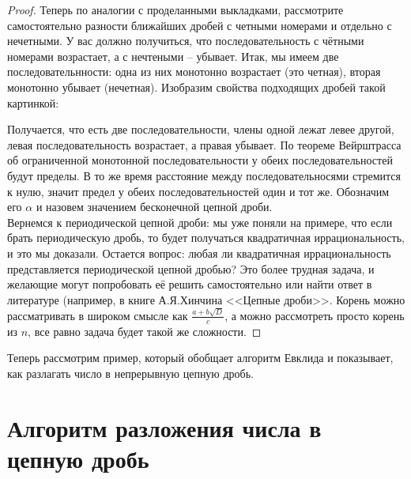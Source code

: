 \documentclass[russian]{lecture-notes}
\begin{document}
\begin{enumerate}
\begin{proof}
			Теперь по аналогии с проделанными выкладками, рассмотрите самостоятельно разности ближайших дробей с четными номерами и отдельно с нечетными. У вас должно получиться, что последовательность с чётными номерами возрастает, а с нечтеными -- убывает. Итак, мы имеем две последовательнности: одна из них монотонно возрастает (это четная), вторая монотонно убывает (нечетная). Изобразим свойства подходящих дробей такой картинкой:
			
			\centering
			\flushleft
			Получается, что есть две последовательности, члены одной лежат левее другой, левая последовательность возрастает, а правая убывает. По теореме Вейрштрасса об ограниченной монотонной последовательности у обеих последовательностей будут пределы.  В то же время расстояние между последовательносями стремится к нулю, значит предел у обеих последовательностей один и тот же. Обозначим его $\alpha$ и назовем значением бесконечной цепной дроби. \\
			Вернемся к периодической цепной дроби: мы уже поняли на примере, что если брать периодическую дробь, то будет получаться квадратичная иррациональность, и это мы доказали. Остается вопрос: любая ли квадратичная иррациональность представляется периодической цепной дробью? Это более трудная задача, и желающие могут попробовать её решить самостоятельно или найти ответ в литературе (например, в книге А.Я.Хинчина <<Цепные дроби>>. Корень можно рассматривать в широком смысле как $\frac{a+b\sqrt{D}}{c}$, а можно рассмотреть просто корень из $n$, все равно задача будет такой же сложности.
		\end{proof}
		
	\end{enumerate}
	\newpage
	Теперь рассмотрим пример, который обобщает алгоритм Евклида и показывает, как разлагать число в непрерывную цепную дробь.
	
	\section*{Алгоритм разложения числа в цепную дробь}
	
\end{document}
